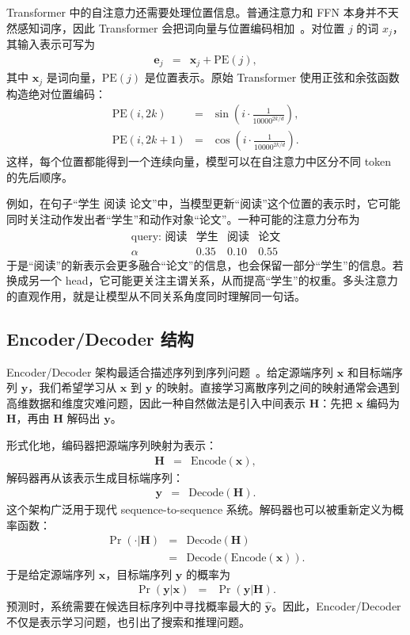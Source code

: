 Transformer 中的自注意力还需要处理位置信息。普通注意力和 FFN 本身并不天然感知词序，因此 Transformer 会把词向量与位置编码相加~\cite{VaswaniEtAl2017Transformer}。对位置 $j$ 的词 $x_j$，其输入表示可写为
\begin{eqnarray}
\mathbf{e}_j
& = &
\mathbf{x}_j+\mathrm{PE}(j),
\end{eqnarray}
\noindent 其中 $\mathbf{x}_j$ 是词向量，$\mathrm{PE}(j)$ 是位置表示。原始 Transformer 使用正弦和余弦函数构造绝对位置编码：
\begin{eqnarray}
\mathrm{PE}(i,2k)
& = &
\sin
\left(
i\cdot\frac{1}{10000^{2k/d}}
\right),\\
\mathrm{PE}(i,2k+1)
& = &
\cos
\left(
i\cdot\frac{1}{10000^{2k/d}}
\right).
\end{eqnarray}
这样，每个位置都能得到一个连续向量，模型可以在自注意力中区分不同 token 的先后顺序。

例如，在句子“学生 阅读 论文”中，当模型更新“阅读”这个位置的表示时，它可能同时关注动作发出者“学生”和动作对象“论文”。一种可能的注意力分布为
\[
\begin{array}{c|ccc}
\text{query: 阅读} & \text{学生} & \text{阅读} & \text{论文}\\ \hline
\alpha & 0.35 & 0.10 & 0.55
\end{array}
\]
于是“阅读”的新表示会更多融合“论文”的信息，也会保留一部分“学生”的信息。若换成另一个 head，它可能更关注主谓关系，从而提高“学生”的权重。多头注意力的直观作用，就是让模型从不同关系角度同时理解同一句话。

\subsection{Encoder/Decoder 结构}

Encoder/Decoder 架构最适合描述序列到序列问题~\cite{cho-etal:2014learning,SutskeverEtAl2014Seq2Seq,BahdanauEtAl2015Attention}。给定源端序列 $\mathbf{x}$ 和目标端序列 $\mathbf{y}$，我们希望学习从 $\mathbf{x}$ 到 $\mathbf{y}$ 的映射。直接学习离散序列之间的映射通常会遇到高维数据和维度灾难问题，因此一种自然做法是引入中间表示 $\mathbf{H}$：先把 $\mathbf{x}$ 编码为 $\mathbf{H}$，再由 $\mathbf{H}$ 解码出 $\mathbf{y}$。

形式化地，编码器把源端序列映射为表示：
\begin{eqnarray}
\mathbf{H}
& = &
\mathrm{Encode}(\mathbf{x}),
\end{eqnarray}
解码器再从该表示生成目标端序列：
\begin{eqnarray}
\mathbf{y}
& = &
\mathrm{Decode}(\mathbf{H}).
\end{eqnarray}
这个架构广泛用于现代 sequence-to-sequence 系统。解码器也可以被重新定义为概率函数：
\begin{eqnarray}
\Pr(\cdot|\mathbf{H})
& = &
\mathrm{Decode}(\mathbf{H})
\nonumber \\
& = &
\mathrm{Decode}(\mathrm{Encode}(\mathbf{x})).
\end{eqnarray}
于是给定源端序列 $\mathbf{x}$，目标端序列 $\mathbf{y}$ 的概率为
\begin{eqnarray}
\Pr(\mathbf{y}|\mathbf{x})
& = &
\Pr(\mathbf{y}|\mathbf{H}).
\end{eqnarray}
预测时，系统需要在候选目标序列中寻找概率最大的 $\hat{\mathbf{y}}$。因此，Encoder/Decoder 不仅是表示学习问题，也引出了搜索和推理问题。


